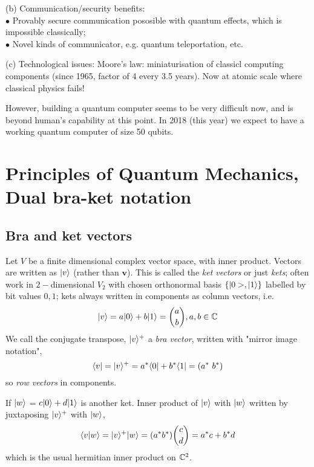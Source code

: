 \documentclass[a4paper]{article}
\begin{document}
(b) Communication/security benefits:\\
$\bullet$ Provably secure communication pososible with quantum effects, which is impossible classically;\\
$\bullet$ Novel kinds of communicator, e.g. quantum teleportation, etc.

(c) Technological issues: Moore's law: miniaturisation of classicl computing components (since 1965, factor of 4 every 3.5 years). Now at atomic scale where classical physics fails!

However, building a quantum computer seems to be very difficult now, and is beyond human's capability at this point. In 2018 (this year) we expect to have a working quantum computer of size 50 qubits.

\newpage

\section{Principles of Quantum Mechanics, Dual bra-ket notation}

\subsection{Bra and ket vectors}

Let $V$ be a finite dimensional complex vector space, with inner product. Vectors are written as $|v\rangle$ (rather than $\mathbf{v}$). This is called the \emph{ket vectors} or just \emph{kets}; often work in $2-$dimensional $V_2$ with chosen orthonormal basis $\{|0>,|1\rangle\}$ labelled by bit values $0,1$; kets always written in components as column vectors, i.e.
\begin{equation*}
\begin{aligned}
|v\rangle = a|0\rangle+b|1\rangle = {a \choose b}, a,b \in \mathbb{C}
\end{aligned}
\end{equation*}
We call the conjugate transpose, $|v\rangle^+$ a \emph{bra vector}, written with "mirror image notation",$$\langle v| = |v\rangle^+ = a^*\langle 0| + b^* \langle 1| = (a^* \ b^*)$$ so \emph{row vectors} in components.

If $|w\rangle$ = $c|0\rangle + d|1\rangle$ is another ket. Inner product of $|v\rangle$ with $|w\rangle$ written by juxtaposing $|v\rangle^+$ with $|w\rangle$,
\begin{equation*}
\begin{aligned}
\langle v|w \rangle = |v\rangle^+ |w\rangle = (a^* b^*) {c \choose d} = a^*c + b^* d
\end{aligned}
\end{equation*}
which is the usual hermitian inner product on $\mathbb{C}^2$.
\end{document}

